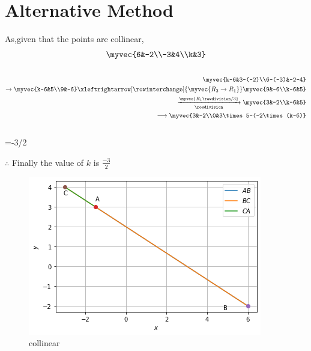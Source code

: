 \documentclass[journal,12pt,twocolumn]{IEEEtran}
\begin{document}
\section{Alternative Method}
As,given that the points are collinear,
\begin{align}
\myvec{6&-2\\-3&4\\k&3}
\end{align}
\begin{align*}\\

\myvec{k-6&3-(-2)\\6-(-3)&-2-4}\\
\rightarrow
\myvec{k-6&5\\9&-6}
\xleftrightarrow[\rowinterchange]{\myvec{R_2\rightarrow R_1}}
\myvec{9&-6\\k-6&5}\\
\xrightarrow[\rowdivision]{\myvec{R_1\rowdivision/3}}
\myvec{3&-2\\k-6&5}\\
\longrightarrow
\myvec{3&-2\\0&3\times5-(-2\times(k-6)}
\end{align*}
\\ 
={-3/2}

 $\therefore$ Finally the value of $k$ is $\frac{-3}{2}$
 
 
 \begin{figure}[h!]
\includegraphics[width=\linewidth]{Collinear.png}
  \caption{collinear}
  \label{collinear points}
\end{figure}
%
\end{document}

